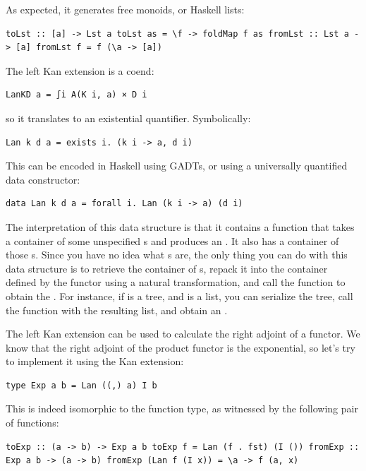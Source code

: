As expected, it generates free monoids, or Haskell lists:

\begin{verbatim}
toLst :: [a] -> Lst a toLst as = \f -> foldMap f as fromLst :: Lst a -> [a] fromLst f = f (\a -> [a])
\end{verbatim}

The left Kan extension is a coend:

\begin{verbatim}
LanKD a = ∫i A(K i, a) × D i
\end{verbatim}

so it translates to an existential quantifier. Symbolically:

\begin{verbatim}
Lan k d a = exists i. (k i -> a, d i)
\end{verbatim}

This can be encoded in Haskell using GADTs, or using a universally
quantified data constructor:

\begin{verbatim}
data Lan k d a = forall i. Lan (k i -> a) (d i)
\end{verbatim}

The interpretation of this data structure is that it contains a function
that takes a container of some unspecified s and produces an
. It also has a container of those s. Since you have
no idea what s are, the only thing you can do with this data
structure is to retrieve the container of s, repack it into
the container defined by the functor  using a natural
transformation, and call the function to obtain the . For
instance, if  is a tree, and  is a list, you can
serialize the tree, call the function with the resulting list, and
obtain an .

The left Kan extension can be used to calculate the right adjoint of a
functor. We know that the right adjoint of the product functor is the
exponential, so let's try to implement it using the Kan extension:

\begin{verbatim}
type Exp a b = Lan ((,) a) I b
\end{verbatim}

This is indeed isomorphic to the function type, as witnessed by the
following pair of functions:

\begin{verbatim}
toExp :: (a -> b) -> Exp a b toExp f = Lan (f . fst) (I ()) fromExp :: Exp a b -> (a -> b) fromExp (Lan f (I x)) = \a -> f (a, x)
\end{verbatim}

